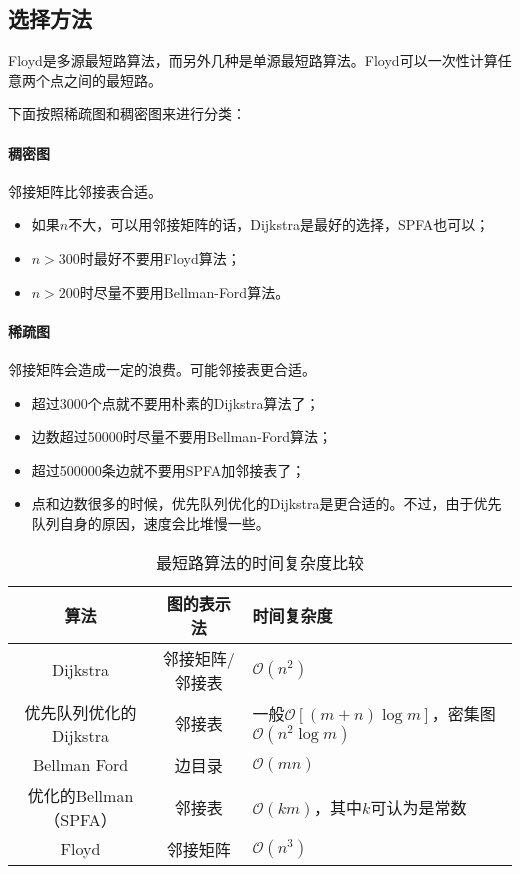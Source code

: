 \subsection{选择方法}

Floyd是多源最短路算法，而另外几种是单源最短路算法。Floyd可以一次性计算任意两个点之间的最短路。

下面按照稀疏图和稠密图来进行分类：

\paragraph{稠密图} 邻接矩阵比邻接表合适。

\begin{itemize}
	\item 如果$n$不大，可以用邻接矩阵的话，Dijkstra是最好的选择，SPFA也可以；
	\item $n>300$时最好不要用Floyd算法；
	\item $n>200$时尽量不要用Bellman-Ford算法。
\end{itemize}

\paragraph{稀疏图} 邻接矩阵会造成一定的浪费。可能邻接表更合适。

\begin{itemize}
	\item 超过3000个点就不要用朴素的Dijkstra算法了；
	\item 边数超过50000时尽量不要用Bellman-Ford算法；
	\item 超过500000条边就不要用SPFA加邻接表了；
	\item 点和边数很多的时候，优先队列优化的Dijkstra是更合适的。不过，由于优先队列自身的原因，速度会比堆慢一些。
\end{itemize}

\begin{table}[htbp]
	\centering
	\caption{最短路算法的时间复杂度比较}
	\begin{tabular}{|c|c|l|}
		\hline \textbf{算法} & \textbf{图的表示法} & \textbf{时间复杂度} \\ 
		\hline Dijkstra & 邻接矩阵/邻接表 & $\mathcal{O}(n^2)$ \\ 
		\hline 优先队列优化的Dijkstra & 邻接表 & 一般$\mathcal{O}[(m+n)\log m]$，密集图$\mathcal{O}(n^2\log m)$ \\ 
		\hline Bellman Ford & 边目录 & $\mathcal{O}(mn)$ \\ 
		\hline 优化的Bellman（SPFA） & 邻接表 & $\mathcal{O}(km)$，其中$k$可认为是常数 \\ 
		\hline Floyd & 邻接矩阵 & $\mathcal{O}(n^3)$ \\ 
		\hline 
	\end{tabular}
\end{table}

